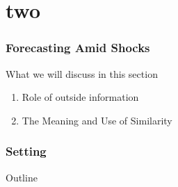 \documentclass[9pt]{beamer}
\theoremstyle{definition}
\begin{document}


\part{two}
\section{Forecasting Amid Shocks}
\begin{frame}{What we will discuss in this section}
    \begin{enumerate}
    \item Role of outside information
    \item The Meaning and Use of Similarity 
    \end{enumerate}
\end{frame}

\section{Setting}
\begin{frame}{Outline} %
    \tableofcontents[part=1,currentsection]\tableofcontents
\end{frame}
\end{document}
